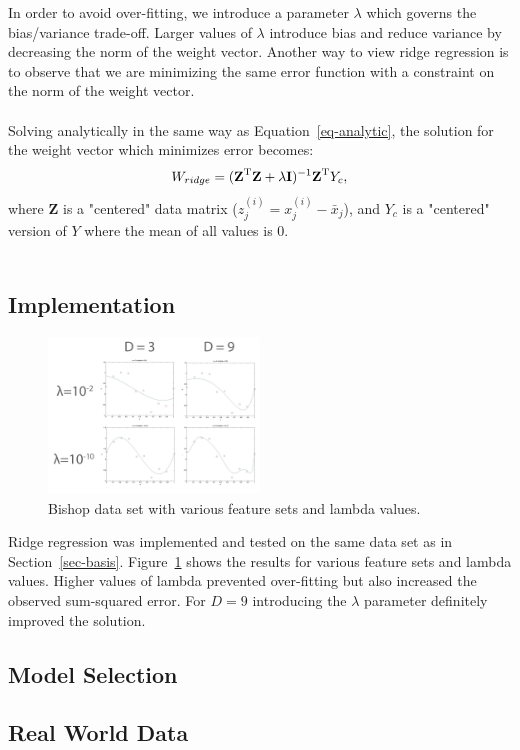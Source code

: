 \documentclass[11pt]{article}   %
\theoremstyle{plain}
\begin{document}
In order to avoid over-fitting, we introduce a parameter $\lambda$ which governs the bias/variance trade-off. Larger values of $\lambda$ introduce bias and reduce variance by decreasing the norm of the weight vector. Another way to view ridge regression is to observe that we are minimizing the same error function with a constraint on the norm of the weight vector. \\
\\
\indent Solving analytically in the same way as Equation~\ref{eq-analytic}, the solution for the weight vector which minimizes error becomes:
\begin{equation}
W_{ridge} = (\textbf{Z}^\textnormal{T}\textbf{Z}+\lambda \textbf{I})^{-1} \textbf{Z}^\textnormal{T} Y_c,
\end{equation}
where $\textbf{Z}$ is a "centered" data matrix ($z_j^{(i)} = x_j^{(i)} - \bar{x}_j$), and $Y_c$ is a "centered" version of $Y$ where the mean of all values is 0. \\
\\
\indent

\subsection{Implementation}

\begin{figure}[h!]\label{fig-ridge-bishop}
  \caption{Bishop data set with various feature sets and lambda values.}
  \centering
    \includegraphics[width=0.5\textwidth]{figures/problem_2_3_bishop.png}
\end{figure}

Ridge regression was implemented and tested on the same data set as in Section~\ref{sec-basis}. Figure~\ref{fig-ridge-bishop} shows the results for various feature sets and lambda values. Higher values of lambda prevented over-fitting but also increased the observed sum-squared error. For $D = 9$ introducing the $\lambda$ parameter definitely improved the solution.

\subsection{Model Selection}

\subsection{Real World Data}
\end{document}
